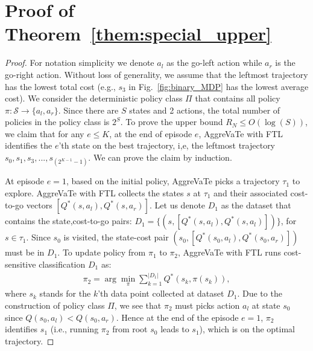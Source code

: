 \documentclass{article}
\begin{document}
\section{Proof of Theorem~\ref{them:special_upper}}
\label{sec:special_upper}
\begin{proof}
For notation simplicity we denote $a_l$ as the go-left action while $a_r$ is the go-right action. Without loss of generality, we assume that the leftmost trajectory has the lowest total cost (e.g., $s_3$ in Fig.~\ref{fig:binary_MDP} has the lowest average cost).
We consider the deterministic policy class $\Pi$ that contains all policy $\pi: \mathcal{S}\to \{a_l,a_r\}$. Since there are $S$ states and 2 actions, the total number of policies in the policy class is $2^S$. To prove the upper bound $R_N\leq O(\log(S))$, we claim that for any $e\leq K$, at the end of episode $e$, AggreVaTe with FTL identifies the $e$'th state on the best trajectory, i,e, the leftmost trajectory $s_0, s_1, s_3, ..., s_{(2^{K-1}-1)}$. We can prove the claim by induction. 

At episode $e=1$, based on the initial policy, AggreVaTe picks a trajectory $\tau_1$ to explore. %
AggreVaTe with FTL collects the states $s$ at $\tau_1$ and their associated cost-to-go vectors $[Q^*(s,a_l), Q^*(s,a_r)]$. Let us denote $D_1$ as the dataset that contains the state,cost-to-go pairs: $D_1 = \{(s, [Q^*(s,a_l),Q^*(s,a_l)])\}$, for $s\in \tau_1$. Since $s_0$ is visited, the state-cost pair $(s_0, [Q^*(s_0,a_l),Q^*(s_0,a_r)])$ must be in $D_1$. To update policy from $\pi_1$ to $\pi_2$, AggreVaTe with FTL runs cost-sensitive classification $D_1$ as:
\begin{align}
\label{eq:cs}
\pi_2 = \arg\min_{\pi}\sum_{k=1}^{|D_1|} Q^*(s_k, \pi(s_k)),
\end{align} where $s_k$ stands for the $k$'th data point collected at dataset $D_1$. Due to the construction of policy class $\Pi$, we see that $\pi_2$ must picks action $a_l$ at state $s_0$ since $Q(s_0,a_l)<Q(s_0,a_r)$. Hence at the end of the episode $e=1$, $\pi_2$ identifies $s_1$ (i.e., running $\pi_2$ from root $s_0$ leads to $s_1$), which is on the optimal trajectory.  


\end{proof}
\end{document}

